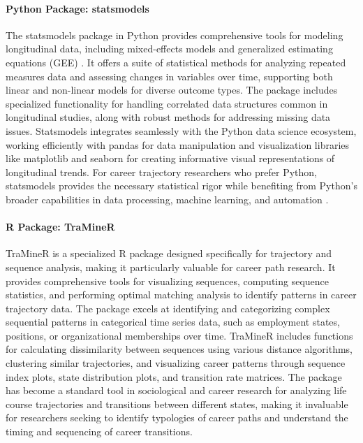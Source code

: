 \documentclass[../main.tex]{subfiles}
\begin{document}
\paragraph{Python Package: statsmodels}
The statsmodels package in Python provides comprehensive tools for modeling longitudinal data, including mixed-effects models and generalized estimating equations (GEE) \cite{statsmodels2024}. It offers a suite of statistical methods for analyzing repeated measures data and assessing changes in variables over time, supporting both linear and non-linear models for diverse outcome types. The package includes specialized functionality for handling correlated data structures common in longitudinal studies, along with robust methods for addressing missing data issues. Statsmodels integrates seamlessly with the Python data science ecosystem, working efficiently with pandas for data manipulation and visualization libraries like matplotlib and seaborn for creating informative visual representations of longitudinal trends. For career trajectory researchers who prefer Python, statsmodels provides the necessary statistical rigor while benefiting from Python's broader capabilities in data processing, machine learning, and automation \cite{statsmodels2024}.

\paragraph{R Package: TraMineR}
TraMineR is a specialized R package designed specifically for trajectory and sequence analysis, making it particularly valuable for career path research. It provides comprehensive tools for visualizing sequences, computing sequence statistics, and performing optimal matching analysis to identify patterns in career trajectory data. The package excels at identifying and categorizing complex sequential patterns in categorical time series data, such as employment states, positions, or organizational memberships over time. TraMineR includes functions for calculating dissimilarity between sequences using various distance algorithms, clustering similar trajectories, and visualizing career patterns through sequence index plots, state distribution plots, and transition rate matrices. The package has become a standard tool in sociological and career research for analyzing life course trajectories and transitions between different states, making it invaluable for researchers seeking to identify typologies of career paths and understand the timing and sequencing of career transitions.
\end{document}
